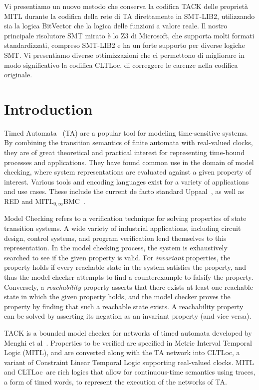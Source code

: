 \documentclass[a4paper,11pt]{report}
\theoremstyle{definition}
\newcommand{\cltloc}{CLTLoc}
\begin{document}
Vi presentiamo un nuovo metodo che conserva la codifica TACK delle proprietà
MITL durante la codifica della rete di TA direttamente in SMT-LIB2, utilizzando
sia la logica BitVector che la logica delle funzioni a valore reale. Il nostro
principale risolutore SMT mirato è lo Z3 di Microsoft, che supporta molti
formati standardizzati, compreso SMT-LIB2 e ha un forte supporto per diverse
logiche SMT. Vi presentiamo diverse ottimizzazioni che ci permettono di
migliorare in modo significativo la codifica CLTLoc, di correggere le
carenze nella codifica originale.

\chapter{Introduction}\label{introduction}

Timed Automata~\cite{alur94} (TA) are a popular tool for modeling time-sensitive
systems. By combining the transition semantics of finite automata with
real-valued clocks, they are of great theoretical and practical interest for
representing time-bound processes and applications. They have found common use
in the domain of model checking, where system representations are evaluated
against a given property of interest. Various tools and encoding languages exist
for a variety of applications and use cases. These include the current de facto
standard Uppaal~\cite{larsen97}, as well as RED and
$\text{MITL}_{0,\infty}$BMC~\cite{kindermann13}.

Model Checking refers to a verification technique for solving properties of
state transition systems. A wide variety of industrial applications, including
circuit design, control systems, and program verification lend themselves to
this representation. In the model checking process, the system is exhaustively
searched to see if the given property is valid. For \emph{invariant} properties,
the property holds if every reachable state in the system satisfies the
property, and thus the model checker attempts to find a counterexample to
falsify the property. Conversely, a \emph{reachability} property asserts that
there exists at least one reachable state in which the given property holds, and
the model checker proves the property by finding that such a reachable state
exists. A reachability property can be solved by asserting its negation as an
invariant property (and vice versa).


TACK is a bounded model checker for networks of timed automata developed by
Menghi et al~\cite{tack20}. Properties to be verified are specified in Metric
Interval Temporal Logic (MITL), and are converted along with the TA network into
\cltloc, a variant of Constraint Linear Temporal Logic supporting real-valued
clocks. MITL and \cltloc\ are rich logics that allow for continuous-time
semantics using traces, a form of timed words, to represent the execution of the
networks of TA.
\end{document}
